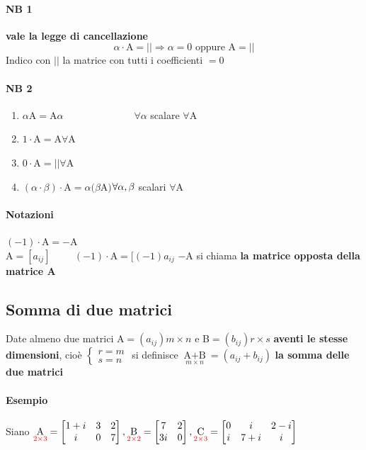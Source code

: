 \paragraph{NB 1} \textbf{vale la legge di cancellazione} \\
$$\alpha \cdot \textrm{A} = || \Longrightarrow \alpha=0\textrm{ oppure A}=||$$
Indico con $||$ la matrice con tutti i coefficienti $=0$
\paragraph{NB 2} 
\begin{enumerate} 
    \item $\alpha$A$=$A$\alpha \hspace{3cm}\forall\alpha$ scalare $\forall$A
    \item $1\cdot$A$=$A\hspace{3cm}$\forall$A
    \item $0\cdot$A$=||$\hspace{3cm}$\forall$A
    \item $(\alpha\cdot\beta)\cdot$A$=\alpha(\beta$A$)$\hspace{2cm}$\\
        \forall \alpha , \beta$ scalari
        $\forall$A
\end{enumerate} 
\paragraph{Notazioni} $(-1)\cdot$A$=-$A\\
A$=[a_{ij}]\hspace{1cm}(-1)\cdot$A$=[(-1)a_{ij}$
$-$A si chiama \textbf{la matrice opposta della matrice A}
\subsection{Somma di due matrici}
Date almeno due matrici A$=(a_{ij})m\times n$ e B$=(b_{ij})r\times s$ 
\textbf{aventi le stesse dimensioni}, cioè 
$
\begin{cases}
    r=m\\
    s=n
\end{cases}
$
si definisce $\underset{m\times n}{\textrm{A}+\textrm{B}}=(a_{ij}+b_{ij})$ \textbf{la somma delle due matrici}

\paragraph{Esempio} Siano 
$
\underset{{\color{red}2\times 3}}{\textrm{A}}=
\begin{bmatrix}
    1+i & 3 & 2\\
    i   & 0 & 7
\end{bmatrix},
\underset{{\color{red}2\times 2}}{\textrm{B}}=
\begin{bmatrix}
    7 & 2\\
    3i & 0
\end{bmatrix},
\underset{{\color{red}2\times 3}}{\textrm{C}}=
\begin{bmatrix}
    0 & i   & 2-i\\
    i & 7+i & i
\end{bmatrix}
$\\ 

